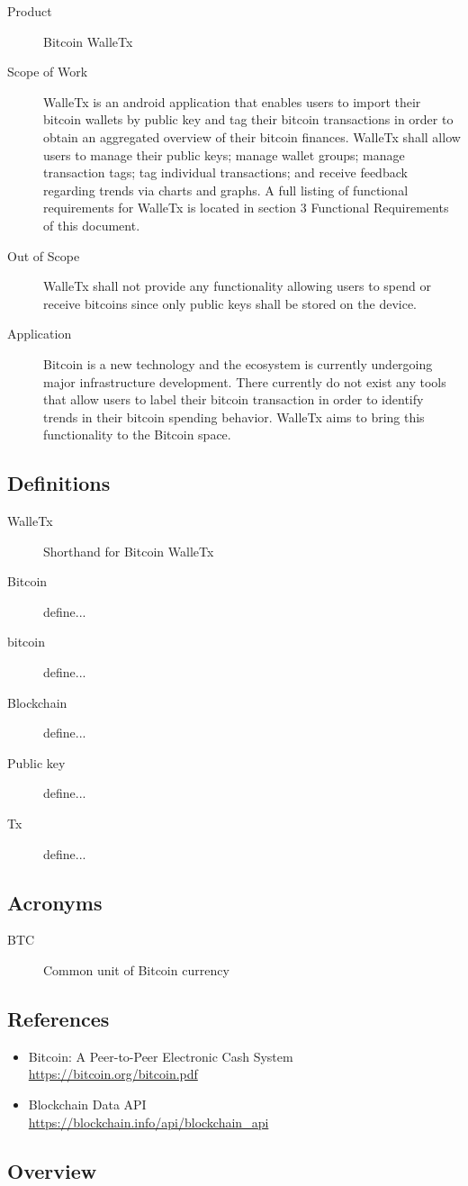 	\begin{description}
		\item[Product] Bitcoin WalleTx
		\item[Scope of Work]WalleTx is an android application that enables users to import their bitcoin wallets by public key and tag their bitcoin transactions in order to obtain an aggregated overview of their bitcoin finances. WalleTx shall allow users to manage their public keys; manage wallet groups; manage transaction tags; tag individual transactions; and receive feedback regarding trends via charts and graphs. A full listing of functional requirements for WalleTx is located in section 3 Functional Requirements of this document.
		\item[Out of Scope]WalleTx shall not provide any functionality allowing users to spend or receive bitcoins since only public keys shall be stored on the device.
		\item[Application]Bitcoin is a new technology and the ecosystem is currently undergoing major infrastructure development. There currently do not exist any tools that allow users to label their bitcoin transaction in order to identify trends in their bitcoin spending behavior. WalleTx aims to bring this functionality to the Bitcoin space.
	\end{description}
    
	\subsection{Definitions}

	\begin{description}
		\item[WalleTx] Shorthand for Bitcoin WalleTx
		\item[Bitcoin] define...
		\item[bitcoin] define...
		\item[Blockchain] define...
		\item[Public key] define...
		\item[Tx] define...
	\end{description}

	\subsection{Acronyms}

	\begin{description}
		\item[BTC] Common unit of Bitcoin currency
	\end{description}

	\subsection{References}

	\begin{itemize}
		\item Bitcoin: A Peer-to-Peer Electronic Cash System\\ \url{https://bitcoin.org/bitcoin.pdf}
		\item Blockchain Data API\\ \url{https://blockchain.info/api/blockchain_api}
	\end{itemize}

	\subsection{Overview}
